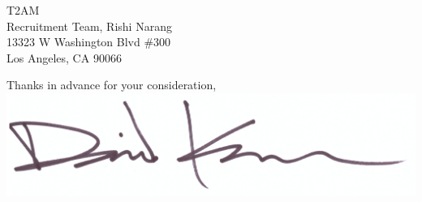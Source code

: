 \documentclass{letter}
\begin{document}
\begin{letter}{
  T2AM \\
  Recruitment Team, Rishi Narang \\
  13323 W Washington Blvd \#300 \\
  Los Angeles, CA 90066
}
\closing{
  Thanks in advance for your consideration, \\
  \vspace{.33in}
  \includegraphics[scale=0.33]{signature.png}
}

\end{letter}
\end{document}
